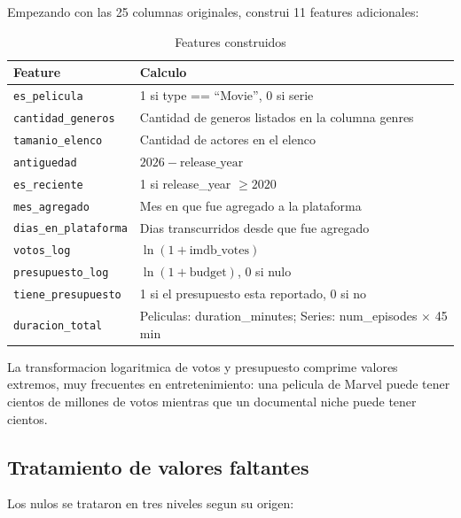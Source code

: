 \documentclass[12pt, a4paper]{article}
\begin{document}
Empezando con las 25 columnas originales, construi 11 features adicionales:

\begin{table}[H]
\centering
\caption{Features construidos}
\begin{tabular}{lp{9.5cm}}
\toprule
\textbf{Feature} & \textbf{Calculo} \\
\midrule
\texttt{es\_pelicula}         & 1 si type == ``Movie'', 0 si serie \\
\texttt{cantidad\_generos}    & Cantidad de generos listados en la columna genres \\
\texttt{tamanio\_elenco}      & Cantidad de actores en el elenco \\
\texttt{antiguedad}           & $2026 - \text{release\_year}$ \\
\texttt{es\_reciente}         & 1 si release\_year $\geq 2020$ \\
\texttt{mes\_agregado}        & Mes en que fue agregado a la plataforma \\
\texttt{dias\_en\_plataforma} & Dias transcurridos desde que fue agregado \\
\texttt{votos\_log}           & $\ln(1 + \text{imdb\_votes})$ \\
\texttt{presupuesto\_log}     & $\ln(1 + \text{budget})$, 0 si nulo \\
\texttt{tiene\_presupuesto}   & 1 si el presupuesto esta reportado, 0 si no \\
\texttt{duracion\_total}      & Peliculas: duration\_minutes; Series: num\_episodes $\times$ 45 min \\
\bottomrule
\end{tabular}
\end{table}

La transformacion logaritmica de votos y presupuesto comprime valores extremos, muy frecuentes en entretenimiento: una pelicula de Marvel puede tener cientos de millones de votos mientras que un documental niche puede tener cientos.

\subsection{Tratamiento de valores faltantes}

Los nulos se trataron en tres niveles segun su origen:
\end{document}
